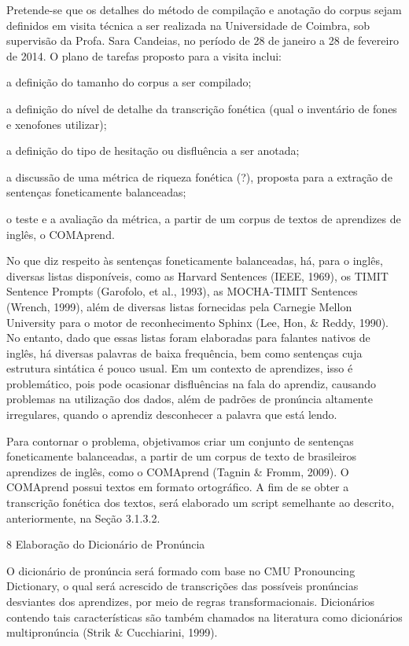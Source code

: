 Pretende-se que os detalhes do m\'etodo de compila\c{c}\~ao e anota\c{c}\~ao do corpus
sejam definidos em visita t\'ecnica a ser realizada na Universidade de
Coimbra, sob supervis\~ao da Profa. Sara Candeias, no per\'iodo de 28 de
janeiro a 28 de fevereiro de 2014. O plano de tarefas proposto para a
visita inclui:

a defini\c{c}\~ao do tamanho do corpus a ser compilado;

a defini\c{c}\~ao do n\'ivel de detalhe da transcri\c{c}\~ao fon\'etica (qual o
invent\'ario de fones e xenofones utilizar);

a defini\c{c}\~ao do tipo de hesita\c{c}\~ao ou disflu\^encia a ser anotada;

a discuss\~ao de uma m\'etrica de riqueza fon\'etica (?), proposta para a
extra\c{c}\~ao de senten\c{c}as foneticamente balanceadas;

o teste e a avalia\c{c}\~ao da m\'etrica, a partir de um corpus de textos de
aprendizes de ingl\^es, o COMAprend.

No que diz respeito às senten\c{c}as foneticamente balanceadas, h\'a, para o
ingl\^es, diversas listas dispon\'iveis, como as Harvard Sentences (IEEE,
1969), os TIMIT Sentence Prompts (Garofolo, et al., 1993), as
MOCHA-TIMIT Sentences (Wrench, 1999), al\'em de diversas listas fornecidas
pela Carnegie Mellon University para o motor de reconhecimento Sphinx
(Lee, Hon, \& Reddy, 1990). No entanto, dado que essas listas foram
elaboradas para falantes nativos de ingl\^es, h\'a diversas palavras de
baixa frequ\^encia, bem como senten\c{c}as cuja estrutura sint\'atica \'e pouco
usual. Em um contexto de aprendizes, isso \'e problem\'atico, pois pode
ocasionar disflu\^encias na fala do aprendiz, causando problemas na
utiliza\c{c}\~ao dos dados, al\'em de padr\~oes de pron\'uncia altamente
irregulares, quando o aprendiz desconhecer a palavra que est\'a lendo.

Para contornar o problema, objetivamos criar um conjunto de senten\c{c}as
foneticamente balanceadas, a partir de um corpus de texto de brasileiros
aprendizes de ingl\^es, como o COMAprend (Tagnin \& Fromm, 2009). O
COMAprend possui textos em formato ortogr\'afico. A fim de se obter a
transcri\c{c}\~ao fon\'etica dos textos, ser\'a elaborado um script semelhante ao
descrito, anteriormente, na Se\c{c}\~ao 3.1.3.2.

8 Elabora\c{c}\~ao do Dicion\'ario de Pron\'uncia

O dicion\'ario de pron\'uncia ser\'a formado com base no CMU Pronouncing
Dictionary, o qual ser\'a acrescido de transcri\c{c}\~oes das poss\'iveis
pron\'uncias desviantes dos aprendizes, por meio de regras
transformacionais. Dicion\'arios contendo tais caracter\'isticas s\~ao tamb\'em
chamados na literatura como dicion\'arios multipron\'uncia (Strik \&
Cucchiarini, 1999).


